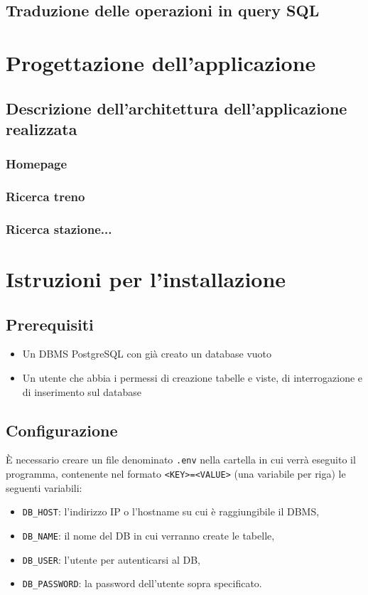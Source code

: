 \documentclass[a4paper,12pt]{report}
\begin{document}
	\section{Traduzione delle operazioni in query SQL}
	\chapter{Progettazione dell'applicazione}
	
	\section{Descrizione dell'architettura dell'applicazione realizzata}
	\subsection{Homepage}
	\subsection{Ricerca treno}
	\subsection{Ricerca stazione...}
	\appendix
	\chapter{Istruzioni per l'installazione}
	\section{Prerequisiti}
	\begin{itemize}
		\item Un DBMS PostgreSQL con già creato un database vuoto
		\item Un utente che abbia i permessi di creazione tabelle e viste, di interrogazione e di inserimento sul database
	\end{itemize}
	\section{Configurazione}
	\par \`E necessario creare un file denominato \texttt{.env} nella cartella in cui verrà eseguito il programma, contenente nel formato \texttt{<KEY>=<VALUE>} (una variabile per riga) le seguenti variabili:
	\begin{itemize}
		\item \texttt{DB\_HOST}: l'indirizzo IP o l'hostname su cui è raggiungibile il DBMS,
		\item \texttt{DB\_NAME}: il nome del DB in cui verranno create le tabelle,
		\item \texttt{DB\_USER}: l'utente per autenticarsi al DB,
		\item \texttt{DB\_PASSWORD}: la password dell'utente sopra specificato.
	\end{itemize}
\end{document}
